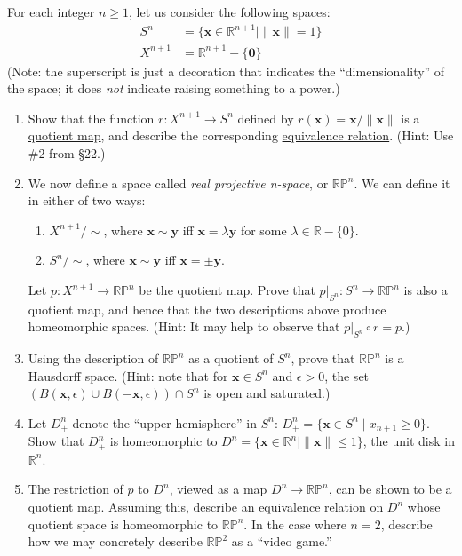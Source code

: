   \begin{exercise}
    For each integer $n \geq 1$, let us consider the following spaces:
    \begin{align*}
      S^n &= \{\mathbf{x} \in \mathbb{R}^{n+1} \mid \|\mathbf{x}\|= 1\} \\
      X^{n+1} &= \mathbb{R}^{n+1} - \{\mathbf{0}\}
    \end{align*}
    (Note: the superscript is just a decoration that indicates the ``dimensionality''
    of the space; it does \textit{not} indicate raising something to a power.)
    \begin{enumerate}
      \item[(1)] Show that the function $r : X^{n+1} \to S^n$ defined by $r(\mathbf{x}) = \mathbf{x}/\|\mathbf{x}\|$ is a
        \hyperref[def:quotient-map]{quotient map}, and describe the corresponding \hyperref[st-def:equivalence_relation]{equivalence relation}. (Hint:
        Use \#2 from \S22.)
        
      \item[(2)] We now define a space called \textit{real projective n-space}, or $\mathbb{RP}^n$. We can
        define it in either of two ways:
        \begin{enumerate}
          \item[(a)] $X^{n+1}/{\sim}$, where $\mathbf{x} \sim \mathbf{y}$ iff $\mathbf{x} = \lambda\mathbf{y}$ for some $\lambda \in \mathbb{R} - \{0\}$.
          \item[(b)] $S^n/{\sim}$, where $\mathbf{x} \sim \mathbf{y}$ iff $\mathbf{x} = \pm\mathbf{y}$.
        \end{enumerate}
        Let $p : X^{n+1} \to \mathbb{RP}^n$ be the quotient map. Prove that $p|_{S^n} : S^n \to \mathbb{RP}^n$ is
        also a quotient map, and hence that the two descriptions above produce
        homeomorphic spaces. (Hint: It may help to observe that $p|_{S^n} \circ r = p$.)
        
      \item[(3)] Using the description of $\mathbb{RP}^n$ as a quotient of $S^n$, prove that $\mathbb{RP}^n$ is
        a Hausdorff space. (Hint: note that for $\mathbf{x} \in S^n$ and $\epsilon > 0$, the set
        $(B(\mathbf{x},\epsilon) \cup B(-\mathbf{x},\epsilon)) \cap S^n$ is open and saturated.)
        
      \item[(4)] Let $D^n_+$ denote the ``upper hemisphere'' in $S^n$: $D^n_+ = \{\mathbf{x} \in S^n \mid x_{n+1} \geq 0\}$.
        Show that $D^n_+$ is homeomorphic to $D^n = \{\mathbf{x} \in \mathbb{R}^n \mid \|\mathbf{x}\| \leq 1\}$, the unit
        disk in $\mathbb{R}^n$.
        
      \item[(5)] The restriction of $p$ to $D^n$, viewed as a map $D^n \to \mathbb{RP}^n$, can be shown
        to be a quotient map. Assuming this, describe an equivalence relation
        on $D^n$ whose quotient space is homeomorphic to $\mathbb{RP}^n$. In the case where
        $n = 2$, describe how we may concretely describe $\mathbb{RP}^2$ as a ``video game.''
    \end{enumerate}
  \end{exercise}
